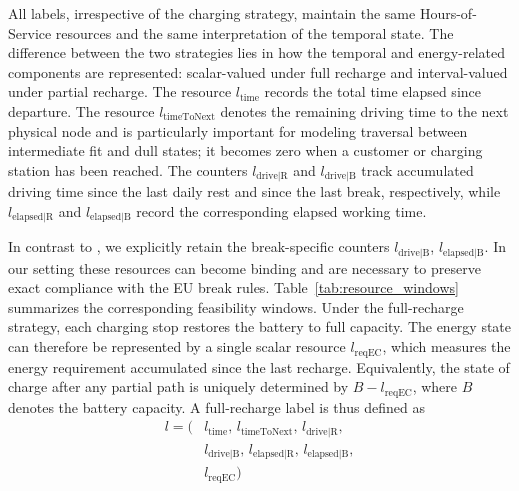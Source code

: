 \documentclass[3p,11pt,authoryear]{elsarticle}  %
\begin{document}
All labels, irrespective of the charging strategy, maintain the same Hours-of-Service resources and the same interpretation of the temporal state. The difference between the two strategies lies in how the temporal and energy-related components are represented: scalar-valued under full recharge and interval-valued under partial recharge. The resource \(l_{\text{time}}\) records the total time elapsed since departure. The resource \(l_{\text{timeToNext}}\) denotes the remaining driving time to the next physical node and is particularly important for modeling traversal between intermediate fit and dull states; it becomes zero when a customer or charging station has been reached. The counters \(l_{\text{drive|R}}\) and \(l_{\text{drive|B}}\) track accumulated driving time since the last daily rest and since the last break, respectively, while \(l_{\text{elapsed|R}}\) and \(l_{\text{elapsed|B}}\) record the corresponding elapsed working time. 


In contrast to \citet{goel2017exact}, we explicitly retain the break-specific counters \(l_{\text{drive|B}}\), \(l_{\text{elapsed|B}}\). In our setting these resources can become binding and are necessary to preserve exact compliance with the EU break rules. Table~\ref{tab:resource_windows} summarizes the corresponding feasibility windows. Under the full-recharge strategy, each charging stop restores the battery to full capacity. The energy state can therefore be represented by a single scalar resource \(l_{\text{reqEC}}\), which measures the energy requirement accumulated since the last recharge. Equivalently, the state of charge after any partial path is uniquely determined by \(B-l_{\text{reqEC}}\), where \(B\) denotes the battery capacity. A full-recharge label is thus defined as
\[
\begin{aligned}
l = (&l_{\text{time}},\, l_{\text{timeToNext}},\, l_{\text{drive|R}},\\
     &l_{\text{drive|B}},\, l_{\text{elapsed|R}},\, l_{\text{elapsed|B}},\\
     &l_{\text{reqEC}})
\end{aligned}
\]

\end{document}
